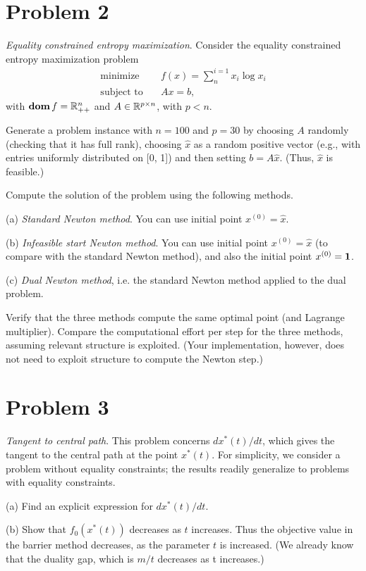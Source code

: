 \documentclass[11pt]{article}
\begin{document}
\clearpage
\section*{Problem 2}
\textit{Equality constrained entropy maximization}. Consider the equality constrained entropy maximization problem
\begin{align*}
    \text{minimize}\quad & f(x) = \sum_{n}^{i=1} x_i \log x_i\\
    \text{subject to}\quad & Ax = b,
\end{align*}
with $\mathop{\textbf{dom}} f = {{\mathbb{R}}}^n_{++}$ and $A\in{{\mathbb{R}}}^{p\times n}$, with $p < n$.

Generate a problem instance with $n = 100$ and $p = 30$ by choosing $A$ randomly (checking that it has full rank), choosing $\hat x$ as a random positive vector (e.g., with entries uniformly distributed on [0, 1]) and then setting $b = A\hat x$. (Thus, $\hat x$ is feasible.)

Compute the solution of the problem using the following methods.

(a) \textit{Standard Newton method}. You can use initial point $x^{(0)} = \hat x$.

(b) \textit{Infeasible start Newton method}. You can use initial point $x^{(0)} = \hat x$ (to compare with the standard Newton method), and also the initial point $x^{(0)} = \mathbf 1$.

(c) \textit{Dual Newton method}, i.e. the standard Newton method applied to the dual problem.

Verify that the three methods compute the same optimal point (and Lagrange multiplier).
Compare the computational effort per step for the three methods, assuming relevant
structure is exploited. 
(Your implementation, however, does not need to exploit structure to compute the Newton step.)

\clearpage
\section*{Problem 3}
\textit{Tangent to central path}. This problem concerns $dx^*(t)/dt$, which gives the tangent to the central path at the point $x^*(t)$. For simplicity, we consider a problem without equality constraints; the results readily generalize to problems with equality constraints.

(a) Find an explicit expression for $dx^*(t)/dt$.

(b) Show that $f_0(x^*(t))$ decreases as $t$ increases. Thus the objective value in the barrier method decreases, as the parameter $t$ is increased. (We already know that the duality gap, which is $m/t$ decreases as t increases.)
\end{document}
